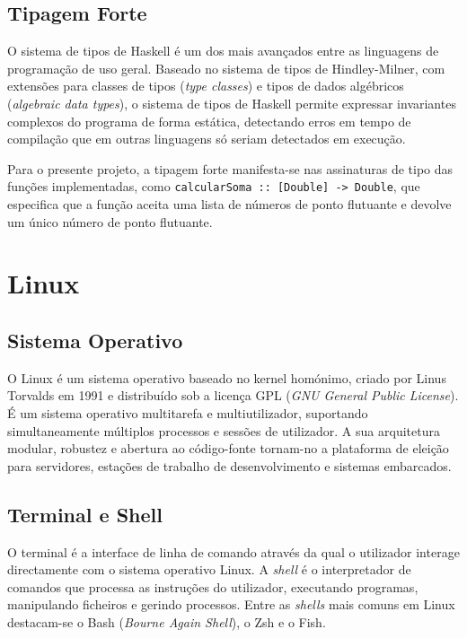 \documentclass[12pt, a4paper, oneside]{report}
\begin{document}
\subsection{Tipagem Forte}

O sistema de tipos de Haskell é um dos mais avançados entre as linguagens de programação de uso geral. Baseado no sistema de tipos de Hindley-Milner, com extensões para classes de tipos (\textit{type classes}) e tipos de dados algébricos (\textit{algebraic data types}), o sistema de tipos de Haskell permite expressar invariantes complexos do programa de forma estática, detectando erros em tempo de compilação que em outras linguagens só seriam detectados em execução.

Para o presente projeto, a tipagem forte manifesta-se nas assinaturas de tipo das funções implementadas, como \texttt{calcularSoma :: [Double] -> Double}, que especifica que a função aceita uma lista de números de ponto flutuante e devolve um único número de ponto flutuante.

\section{Linux}

\subsection{Sistema Operativo}

O Linux é um sistema operativo baseado no kernel homónimo, criado por Linus Torvalds em 1991 e distribuído sob a licença GPL (\textit{GNU General Public License}). É um sistema operativo multitarefa e multiutilizador, suportando simultaneamente múltiplos processos e sessões de utilizador. A sua arquitetura modular, robustez e abertura ao código-fonte tornam-no a plataforma de eleição para servidores, estações de trabalho de desenvolvimento e sistemas embarcados.

\subsection{Terminal e Shell}

O terminal é a interface de linha de comando através da qual o utilizador interage directamente com o sistema operativo Linux. A \textit{shell} é o interpretador de comandos que processa as instruções do utilizador, executando programas, manipulando ficheiros e gerindo processos. Entre as \textit{shells} mais comuns em Linux destacam-se o Bash (\textit{Bourne Again Shell}), o Zsh e o Fish.
\end{document}

